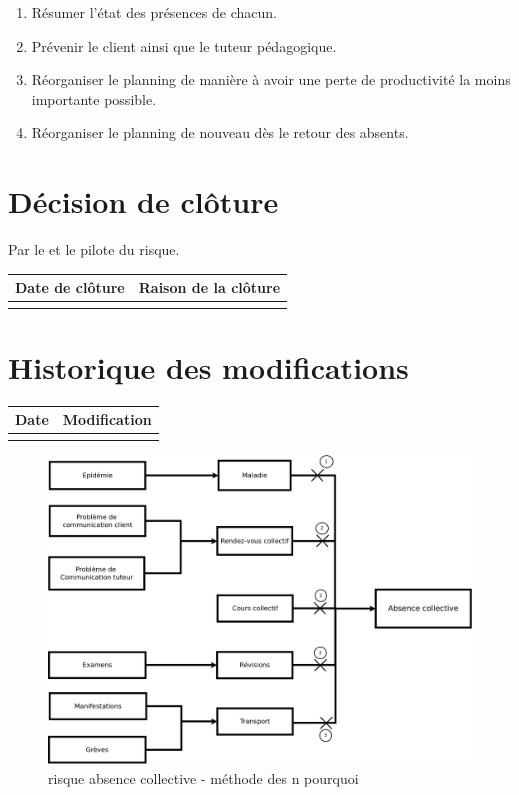 \begin{enumerate}
	\item Résumer l'état des présences de chacun.
	\item Prévenir le client ainsi que le tuteur pédagogique.
	\item Réorganiser le planning de manière à avoir une perte de productivité la moins importante possible.
	\item Réorganiser le planning de nouveau dès le retour des absents.
\end{enumerate}

\section*{Décision de clôture}
Par le \CP{} et le pilote du risque.
\begin{table}[H]
\centering
	\begin{tabularx}{12.8cm}{|X|X|}
	\hline
	\rowcolor{gray!40} Date de clôture & Raison de la clôture \\
	\hline
	  & \\
	\hline
	\end{tabularx}
\end{table}

\section*{Historique des modifications}
\begin{table}[H]
\centering
	\begin{tabularx}{12.8cm}{|X|X|}
	\hline
	\rowcolor{gray!40} Date & Modification \\
	\hline
	  & \\
	\hline
	\end{tabularx}
\end{table}
\newpage


\begin{figure}
	\centering
	\includegraphics[scale=0.2]{images/AnalyseRisque_nPourquoi_FDR003}
        \caption{\label{risque absence collective}risque absence collective - méthode des n pourquoi}
\end{figure}

